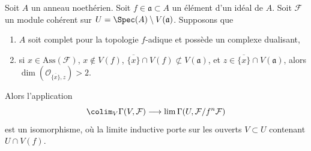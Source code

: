 \begin{proposition}
\label{proposition-alternative-colim-H0}
Soit $A$ un anneau noethérien. Soit $f \in \mathfrak a \subset A$
un élément d'un idéal de $A$. Soit $\mathcal{F}$ un module cohérent
sur $U = \Spec(A) \setminus V(\mathfrak a)$. Supposons que
\begin{enumerate}
\item $A$ soit complet pour la topologie $f$-adique et possède un complexe dualisant,
\item si $x \in \text{Ass}(\mathcal{F})$, $x \not \in V(f)$,
$\overline{\{x\}} \cap V(f) \not \subset V(\mathfrak a)$,
et $z \in \overline{\{x\}} \cap V(\mathfrak a)$, alors
$\dim(\mathcal{O}_{\overline{\{x\}}, z}) > 2$.
\end{enumerate}
Alors l'application
$$
\colim_V \Gamma(V, \mathcal{F})
\longrightarrow
\lim \Gamma(U, \mathcal{F}/f^n\mathcal{F})
$$
est un isomorphisme, où la limite inductive porte sur les ouverts $V \subset U$
contenant $U \cap V(f)$.
\end{proposition}


